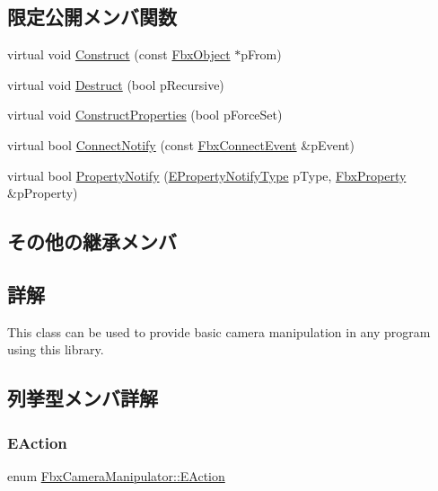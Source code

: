 \subsection*{限定公開メンバ関数}
\begin{DoxyCompactItemize}
\item 
virtual void \hyperlink{class_fbx_camera_manipulator_ac85c39bca662da17932613bd8bbaf95b}{Construct} (const \hyperlink{class_fbx_object}{Fbx\+Object} $\ast$p\+From)
\item 
virtual void \hyperlink{class_fbx_camera_manipulator_aba0217b5fd302152dc0e2726ca3c325a}{Destruct} (bool p\+Recursive)
\item 
virtual void \hyperlink{class_fbx_camera_manipulator_a9e97c5d7f153bbc80a2c233d425a447f}{Construct\+Properties} (bool p\+Force\+Set)
\item 
virtual bool \hyperlink{class_fbx_camera_manipulator_a0cd75ec4a78ef84f2cf10f750e4491c6}{Connect\+Notify} (const \hyperlink{class_fbx_connect_event}{Fbx\+Connect\+Event} \&p\+Event)
\item 
virtual bool \hyperlink{class_fbx_camera_manipulator_aa0b1cdb3a150798e03587a3adeadd87a}{Property\+Notify} (\hyperlink{class_fbx_object_a528f1b2c2b7abbd64c525ba3a9a496b8}{E\+Property\+Notify\+Type} p\+Type, \hyperlink{class_fbx_property}{Fbx\+Property} \&p\+Property)
\end{DoxyCompactItemize}
\subsection*{その他の継承メンバ}


\subsection{詳解}
This class can be used to provide basic camera manipulation in any program using this library. 

\subsection{列挙型メンバ詳解}
\mbox{\label{class_fbx_camera_manipulator_ada0f93888edb4a1c0140e35f99eba922}} 
\subsubsection{\texorpdfstring{E\+Action}{EAction}}
{\footnotesize\ttfamily enum \hyperlink{class_fbx_camera_manipulator_ada0f93888edb4a1c0140e35f99eba922}{Fbx\+Camera\+Manipulator\+::\+E\+Action}}



